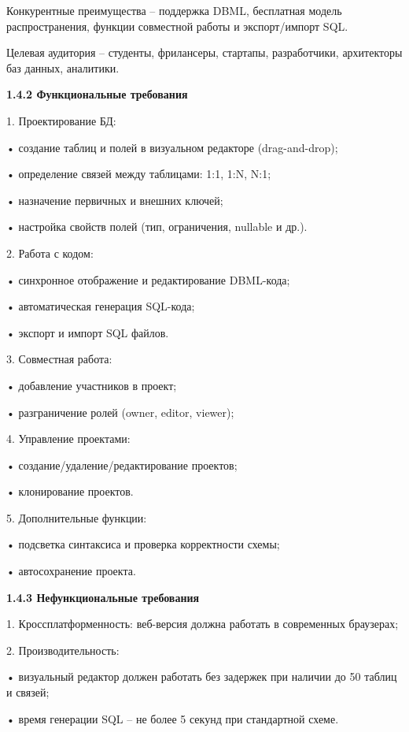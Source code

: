 	Конкурентные преимущества – поддержка DBML, бесплатная модель распространения, функции совместной работы и экспорт/импорт SQL.
    
	Целевая аудитория – студенты, фрилансеры, стартапы, разработчики, архитекторы баз данных, аналитики.

\textbf{\large 1.4.2 Функциональные требования }

	1.	Проектирование БД:
    
	•	создание таблиц и полей в визуальном редакторе (drag-and-drop);
    
	•	определение связей между таблицами: 1:1, 1:N, N:1;
    
	•	назначение первичных и внешних ключей;
    
	•	настройка свойств полей (тип, ограничения, nullable и др.).
    
	2.	Работа с кодом:
    
	•	синхронное отображение и редактирование DBML-кода;
    
	•	автоматическая генерация SQL-кода;
    
	•	экспорт и импорт SQL файлов.
    
	3.	Совместная работа:
    
	•	добавление участников в проект;
    
	•	разграничение ролей (owner, editor, viewer);
    
	4.	Управление проектами:
    
	•	создание/удаление/редактирование проектов;
    
	•	клонирование проектов.
    
	5.	Дополнительные функции:
    
	•	подсветка синтаксиса и проверка корректности схемы;
    
	•	автосохранение проекта.
    

\textbf{\large 1.4.3 Нефункциональные требования }

	1.	Кроссплатформенность: веб-версия должна работать в современных браузерах;
        
	2.	Производительность:
    
	•	визуальный редактор должен работать без задержек при наличии до 50 таблиц и связей;
    
	•	время генерации SQL – не более 5 секунд при стандартной схеме.
    
